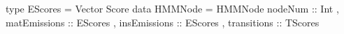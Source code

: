 type EScores = Vector Score
data HMMNode = HMMNode { nodeNum :: Int
                       , matEmissions :: EScores
                       , insEmissions :: EScores
                       , transitions  :: TScores
                       }
